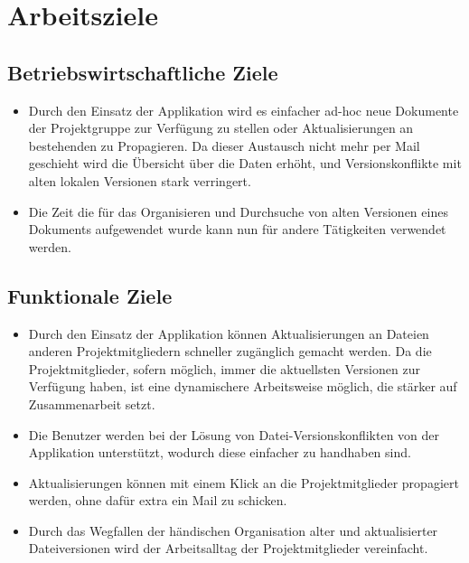 
\section{Arbeitsziele}

\subsection{Betriebswirtschaftliche Ziele}
\begin{itemize}
\item Durch den Einsatz der Applikation wird es einfacher ad-hoc neue Dokumente der Projektgruppe zur Verfügung zu stellen oder Aktualisierungen an bestehenden zu Propagieren. Da dieser Austausch nicht mehr per Mail geschieht wird die Übersicht über die Daten erhöht, und Versionskonflikte mit alten lokalen Versionen stark verringert.

\item Die Zeit die für das Organisieren und Durchsuche von alten Versionen eines Dokuments aufgewendet wurde kann nun für andere Tätigkeiten verwendet werden.
\end{itemize}

\subsection{Funktionale Ziele}
\begin{itemize}
\item Durch den Einsatz der Applikation können Aktualisierungen an Dateien anderen Projektmitgliedern schneller zugänglich gemacht werden. Da die Projektmitglieder, sofern möglich, immer die aktuellsten Versionen zur Verfügung haben, ist eine dynamischere Arbeitsweise möglich, die stärker auf Zusammenarbeit setzt.

\item Die Benutzer werden bei der Lösung von Datei-Versionskonflikten von der Applikation unterstützt, wodurch diese einfacher zu handhaben sind.


\item Aktualisierungen können mit einem Klick an die Projektmitglieder propagiert werden, ohne dafür extra ein Mail zu schicken.

\item Durch das Wegfallen der händischen Organisation alter und aktualisierter Dateiversionen wird der Arbeitsalltag der Projektmitglieder vereinfacht.
\end{itemize}

